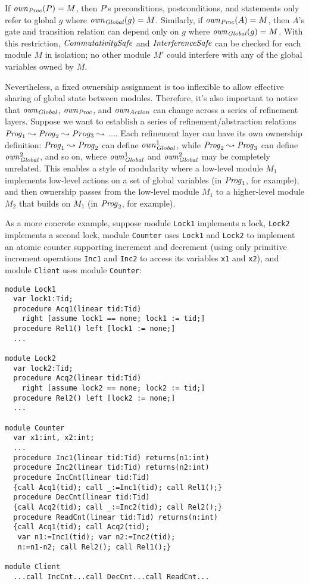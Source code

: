 If $\mathit{own}_{\mathit{Proc}}(P) = M$, then $P$'s preconditions, postconditions, and statements only refer to global $g$ where $\mathit{own}_{\mathit{Global}}(g) = M$.
Similarly, if $\mathit{own}_{\mathit{Proc}}(A) = M$, then $A$'s gate and transition relation can depend only on $g$ where $\mathit{own}_{\mathit{Global}}(g) = M$.
With this restriction, $\mathit{CommutativitySafe}$ and $\mathit{InterferenceSafe}$ can be checked for each module $M$ in isolation;
no other module $M'$ could interfere with any of the global variables owned by $M$.

Nevertheless, a fixed ownership assignment is too inflexible to allow effective sharing of global state between modules.
Therefore, it's also important to notice that $\mathit{own}_{\mathit{Global}}$, $\mathit{own}_{\mathit{Proc}}$, and $\mathit{own}_{\mathit{Action}}$ can change across a series of refinement layers.
Suppose we want to establish a series of refinement/abstraction relations $\mathit{Prog}_1 \leadsto \mathit{Prog}_2 \leadsto Prog_3 \leadsto$ ....
Each refinement layer can have its own ownership definition:
$\mathit{Prog}_1 \leadsto \mathit{Prog}_2$ can define $\mathit{own}_{\mathit{Global}}^1$, while $\mathit{Prog}_2 \leadsto \mathit{Prog}_3$ can define $\mathit{own}_{\mathit{Global}}^2$,
and so on, where $\mathit{own}_{\mathit{Global}}^1$ and $\mathit{own}_{\mathit{Global}}^2$ may be completely unrelated.
This enables a style of modularity where a low-level module $M_1$ implements low-level actions on a set of global variables (in $\mathit{Prog}_1$, for example),
and then ownership passes from the low-level module $M_1$ to a higher-level module $M_2$ that builds on $M_1$ (in $\mathit{Prog}_2$, for example).

As a more concrete example, suppose module \verb`Lock1` implements a lock, \verb`Lock2` implements a second lock,
module \verb`Counter` uses \verb`Lock1` and \verb`Lock2` to implement an atomic counter supporting increment and decrement
(using only primitive increment operations \verb`Inc1` and \verb`Inc2` to access its variables \verb`x1` and \verb`x2`),
and module \verb`Client` uses module \verb`Counter`:

\begin{verbatim}
module Lock1
  var lock1:Tid;
  procedure Acq1(linear tid:Tid)
    right [assume lock1 == none; lock1 := tid;]
  procedure Rel1() left [lock1 := none;]
  ...

module Lock2
  var lock2:Tid;
  procedure Acq2(linear tid:Tid)
    right [assume lock2 == none; lock2 := tid;]
  procedure Rel2() left [lock2 := none;]
  ...

module Counter
  var x1:int, x2:int;
  ...
  procedure Inc1(linear tid:Tid) returns(n1:int)
  procedure Inc2(linear tid:Tid) returns(n2:int)
  procedure IncCnt(linear tid:Tid)
  {call Acq1(tid); call _:=Inc1(tid); call Rel1();}
  procedure DecCnt(linear tid:Tid)
  {call Acq2(tid); call _:=Inc2(tid); call Rel2();}
  procedure ReadCnt(linear tid:Tid) returns(n:int)
  {call Acq1(tid); call Acq2(tid);
   var n1:=Inc1(tid); var n2:=Inc2(tid);
   n:=n1-n2; call Rel2(); call Rel1();}

module Client
  ...call IncCnt...call DecCnt...call ReadCnt...
\end{verbatim}

